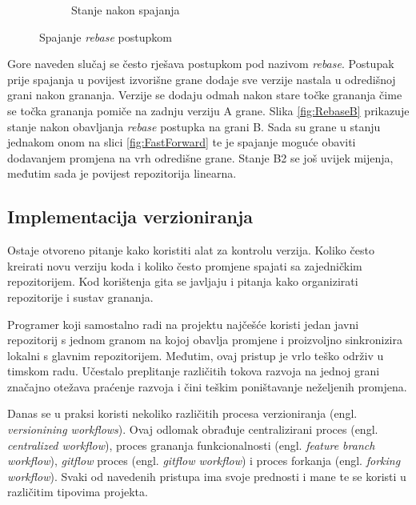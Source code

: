 \documentclass[times, utf8, diplomski, numeric]{fer}
\newcommand{\eng}[1]{(engl. \textit{#1})}
\begin{document}
\begin{figure}[h!]
\begin{subfigure}{.3\textwidth}
\caption{Stanje nakon spajanja}
\label{fig:RebaseC}
\end{subfigure}
\caption{Spajanje \textit{rebase} postupkom}
\label{fig:Rebase}
\end{figure}

Gore naveden slučaj se često rješava postupkom pod nazivom \textit{rebase}. Postupak prije spajanja u povijest izvorišne grane dodaje sve verzije nastala u odredišnoj grani nakon grananja. Verzije se dodaju odmah nakon stare točke grananja čime se točka grananja pomiče na zadnju verziju A grane. Slika \ref{fig:RebaseB} prikazuje stanje nakon obavljanja \textit{rebase} postupka na grani B. Sada su grane u stanju jednakom onom na slici \ref{fig:FastForward} te je spajanje moguće obaviti dodavanjem promjena na vrh odredišne grane. Stanje B2 se još uvijek mijenja, međutim sada je povijest repozitorija linearna.


\subsection{Implementacija verzioniranja} \label{header:Implementacija_verzioniranja}

Ostaje otvoreno pitanje kako koristiti alat za kontrolu verzija. Koliko često kreirati novu verziju koda i koliko često promjene spajati sa zajedničkim repozitorijem. Kod korištenja gita se javljaju i pitanja kako organizirati repozitorije i sustav grananja.

Programer koji samostalno radi na projektu najčešće koristi jedan javni repozitorij s jednom granom na kojoj obavlja promjene i proizvoljno sinkronizira lokalni s glavnim repozitorijem. Međutim, ovaj pristup je vrlo teško održiv u timskom radu. Učestalo preplitanje različitih tokova razvoja na jednoj grani značajno otežava praćenje razvoja i čini teškim poništavanje neželjenih promjena.

Danas se u praksi koristi nekoliko različitih procesa verzioniranja \eng{versionining workflows}. Ovaj odlomak obrađuje centralizirani proces \eng{centralized workflow}, proces grananja funkcionalnosti \eng{feature branch workflow}, \textit{gitflow} proces \eng{gitflow workflow} i proces forkanja \eng{forking workflow}. Svaki od navedenih pristupa ima svoje prednosti i mane te se koristi u različitim tipovima projekta\citep{versioningWorkflows}.
\end{document}
